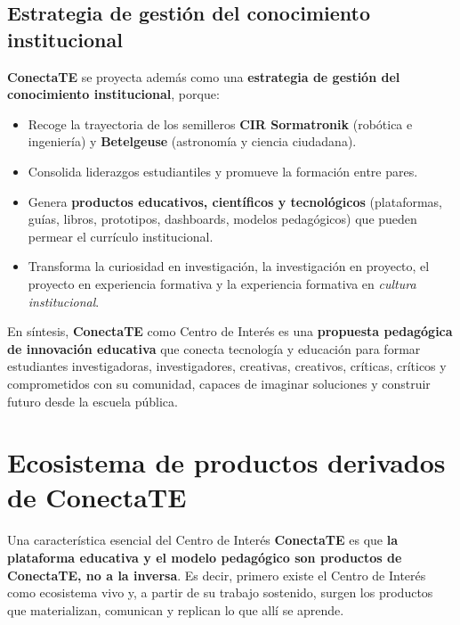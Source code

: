 \documentclass[12pt, letterpaper]{article}
\newcommand{\conectate}{\textbf{ConectaTE}}
\begin{document}
\subsection{Estrategia de gestión del conocimiento institucional}

\conectate{} se proyecta además como una \textbf{estrategia de gestión del conocimiento institucional}, porque:

\begin{itemize}[leftmargin=*]
  \item Recoge la trayectoria de los semilleros \textbf{CIR Sormatronik} (robótica e ingeniería) y \textbf{Betelgeuse} (astronomía y ciencia ciudadana).
  \item Consolida liderazgos estudiantiles y promueve la formación entre pares.
  \item Genera \textbf{productos educativos, científicos y tecnológicos} (plataformas, guías, libros, prototipos, dashboards, modelos pedagógicos) que pueden permear el currículo institucional.
  \item Transforma la curiosidad en investigación, la investigación en proyecto, el proyecto en experiencia formativa y la experiencia formativa en \textit{cultura institucional}.
\end{itemize}

En síntesis, \conectate{} como Centro de Interés es una \textbf{propuesta pedagógica de innovación educativa} que conecta tecnología y educación para formar estudiantes investigadoras, investigadores, creativas, creativos, críticas, críticos y comprometidos con su comunidad, capaces de imaginar soluciones y construir futuro desde la escuela pública.

\section{Ecosistema de productos derivados de ConectaTE}

Una característica esencial del Centro de Interés \conectate{} es que \textbf{la plataforma educativa y el modelo pedagógico son productos de ConectaTE, no a la inversa}. Es decir, primero existe el Centro de Interés como ecosistema vivo y, a partir de su trabajo sostenido, surgen los productos que materializan, comunican y replican lo que allí se aprende.
\end{document}
